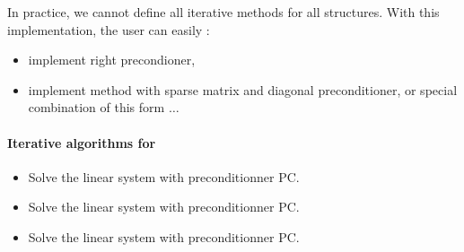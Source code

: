 In practice, we cannot define all iterative methods for all structures.
With this implementation, the user can easily :
\begin{itemize}
\item implement right precondioner, 
\item implement method with sparse matrix and diagonal preconditioner, or
  special combination of this form $\dots$
\end{itemize}


\paragraph{Iterative algorithms for }


\begin{itemize}
\item {}
  \sshortdescribe Solve the linear system  with preconditionner PC.  
\item {}
  \sshortdescribe Solve the linear system  with preconditionner PC.  
\item {}
  \sshortdescribe Solve the linear system  with preconditionner PC.
\end{itemize}

